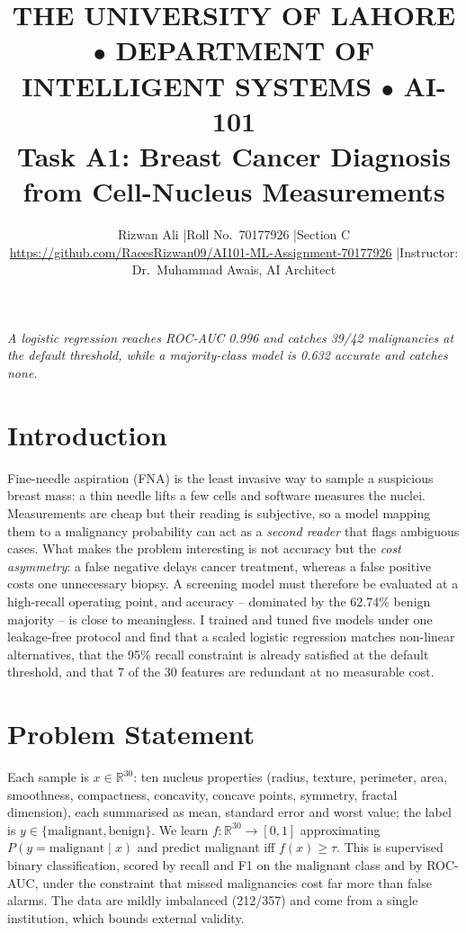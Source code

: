 \documentclass[10pt,conference]{IEEEtran}
\begin{document}
\title{\vspace{-1.2em}\normalsize THE UNIVERSITY OF LAHORE $\bullet$ DEPARTMENT OF INTELLIGENT SYSTEMS $\bullet$ AI-101\\[2pt]
\Large Task A1: Breast Cancer Diagnosis from Cell-Nucleus Measurements}
\author{\normalsize Rizwan Ali \quad|\quad Roll No.\ 70177926 \quad|\quad Section C\\
\normalsize\url{https://github.com/RaeesRizwan09/AI101-ML-Assignment-70177926} \quad|\quad Instructor: Dr.\ Muhammad Awais, AI Architect}
\maketitle
\vspace{-1.4em}
\begin{center}\small\itshape A logistic regression reaches ROC-AUC 0.996 and catches 39/42 malignancies at the default threshold, while a majority-class model is 0.632 accurate and catches none.\end{center}
\vspace{-0.6em}

\section{Introduction}
Fine-needle aspiration (FNA) is the least invasive way to sample a suspicious breast
mass: a thin needle lifts a few cells and software measures the nuclei. Measurements are
cheap but their reading is subjective, so a model mapping them to a malignancy probability
can act as a \emph{second reader} that flags ambiguous cases. What makes the problem
interesting is not accuracy but the \emph{cost asymmetry}: a false negative
delays cancer treatment, whereas a false positive costs one unnecessary biopsy. A
screening model must therefore be evaluated at a high-recall operating point, and accuracy
-- dominated by the 62.74\% benign majority -- is close to
meaningless. I trained and tuned five models under one leakage-free protocol and find that
a scaled logistic regression matches non-linear alternatives, that the 95\% recall
constraint is already satisfied at the default threshold, and that 7 of the
30 features are redundant at no measurable cost.

\section{Problem Statement}
Each sample is $x\in\mathbb{R}^{30}$: ten nucleus properties (radius, texture,
perimeter, area, smoothness, compactness, concavity, concave points, symmetry, fractal
dimension), each summarised as mean, standard error and worst value; the label is
$y\in\{\text{malignant},\text{benign}\}$. We learn
$f:\mathbb{R}^{30}\to[0,1]$ approximating $P(y=\text{malignant}\mid x)$ and predict
malignant iff $f(x)\ge\tau$. This is supervised binary classification, scored by recall and
F1 on the malignant class and by ROC-AUC, under the constraint that missed malignancies
cost far more than false alarms. The data are mildly imbalanced
(212/357) and come from a single
institution, which bounds external validity.
\end{document}

